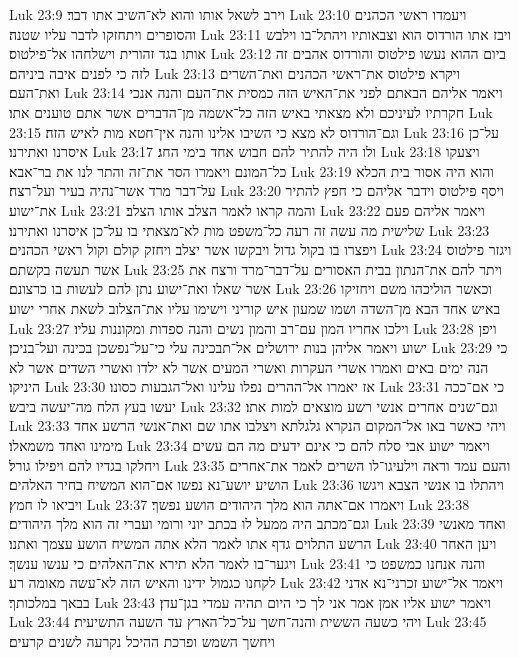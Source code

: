 Luk 23:9  וירב לשאל אותו והוא לא־השיב אתו דבר׃
Luk 23:10  ויעמדו ראשי הכהנים והסופרים ויתחזקו לדבר עליו שטנה׃
Luk 23:11  ויבז אתו הורדוס הוא וצבאותיו ויהתל־בו וילבש אותו בגד זהורית וישלחהו אל־פילטוס׃
Luk 23:12  ביום ההוא נעשו פילטוס והורדוס אהבים זה לזה כי לפנים איבה ביניהם׃
Luk 23:13  ויקרא פילטוס את־ראשי הכהנים ואת־השרים ואת־העם׃
Luk 23:14  ויאמר אליהם הבאתם לפני את־האיש הזה כמסית את־העם והנה אנכי חקרתיו לעיניכם ולא מצאתי באיש הזה כל־אשמה מן־הדברים אשר אתם טוענים אתו׃
Luk 23:15  וגם־הורדוס לא מצא כי השיבו אלינו והנה אין־חטא מות לאיש הזה׃
Luk 23:16  על־כן איסרנו ואתירנו׃
Luk 23:17  ולו היה להתיר להם חבוש אחד בימי החג׃
Luk 23:18  ויצעקו כל־המונם ויאמרו הסר את־זה והתר לנו את בר־אבא׃
Luk 23:19  והוא היה אסור בית הכלא על־דבר מרד אשר־נהיה בעיר ועל־רצח׃
Luk 23:20  ויסף פילטוס וידבר אליהם כי חפץ להתיר את־ישוע׃
Luk 23:21  והמה קראו לאמר הצלב אותו הצלב׃
Luk 23:22  ויאמר אליהם פעם שלישית מה עשה זה רעה כל־משפט מות לא־מצאתי בו על־כן איסרנו ואתירנו׃
Luk 23:23  ויפצרו בו בקול גדול ויבקשו אשר יצלב ויחזק קולם וקול ראשי הכהנים׃
Luk 23:24  ויגזר פילטוס אשר תעשה בקשתם׃
Luk 23:25  ויתר להם את־הנתון בבית האסורים על־דבר־מרד ורצח את אשר שאלו ואת־ישוע נתן להם לעשות בו כרצונם׃
Luk 23:26  וכאשר הוליכהו משם ויחזיקו באיש אחד הבא מן־השדה ושמו שמעון איש קוריני וישימו עליו את־הצלוב לשאת אחרי ישוע׃
Luk 23:27  וילכו אחריו המון עם־רב והמון נשים והנה ספדות ומקוננות עליו׃
Luk 23:28  ויפן ישוע ויאמר אליהן בנות ירושלים אל־תבכינה עלי כי־על־נפשכן בכינה ועל־בניכן׃
Luk 23:29  כי הנה ימים באים ואמרו אשרי העקרות ואשרי המעים אשר לא ילדו ואשרי השדים אשר לא היניקו׃
Luk 23:30  אז יאמרו אל־ההרים נפלו עלינו ואל־הגבעות כסונו׃
Luk 23:31  כי אם־ככה יעשו בעץ הלח מה־יעשה ביבש׃
Luk 23:32  וגם־שנים אחרים אנשי רשע מוצאים למות אתו׃
Luk 23:33  ויהי כאשר באו אל־המקום הנקרא גלגלתא ויצלבו אתו שם ואת־אנשי הרשע אחד מימינו ואחד משמאלו׃
Luk 23:34  ויאמר ישוע אבי סלח להם כי אינם ידעים מה הם עשים ויחלקו בגדיו להם ויפילו גורל׃
Luk 23:35  והעם עמד וראה וילעיגו־לו השרים לאמר את־אחרים הושיע יושע־נא נפשו אם־הוא המשיח בחיר האלהים׃
Luk 23:36  ויהתלו בו אנשי הצבא ויגשו ויביאו לו חמץ׃
Luk 23:37  ויאמרו אם־אתה הוא מלך היהודים הושע נפשך׃
Luk 23:38  וגם־מכתב היה ממעל לו בכתב יוני ורומי ועברי זה הוא מלך היהודים׃
Luk 23:39  ואחד מאנשי הרשע התלוים גדף אתו לאמר הלא אתה המשיח הושע עצמך ואתנו׃
Luk 23:40  ויען האחר ויגער־בו לאמר הלא תירא את־האלהים כי ענשו ענשך׃
Luk 23:41  והנה אנחנו כמשפט כי לקחנו כגמול ידינו והאיש הזה לא־עשה מאומה רע׃
Luk 23:42  ויאמר אל־ישוע זכרני־נא אדני בבאך במלכותך׃
Luk 23:43  ויאמר ישוע אליו אמן אמר אני לך כי היום תהיה עמדי בגן־עדן׃
Luk 23:44  ויהי כשעה הששית והנה־חשך על־כל־הארץ עד השעה התשיעית׃
Luk 23:45  ויחשך השמש ופרכת ההיכל נקרעה לשנים קרעים׃
